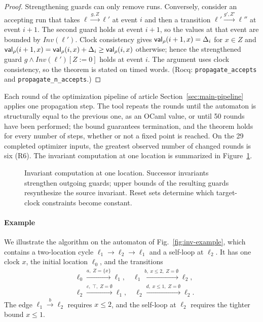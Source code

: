 \begin{proof}
Strengthening guards can only remove runs.  Conversely, consider an accepting
run that takes $\ell\xrightarrow{g,Z}\ell'$ at event $i$ and then a transition
$\ell'\xrightarrow{g',Z'}\ell''$ at event $i+1$.  The second guard holds at event
$i+1$, so the values at that event are bounded by $\mathit{Inv}(\ell')$.  Clock
consistency gives $\mathsf{val}_\rho(i+1,x)=\Delta_i$ for $x\in Z$ and
$\mathsf{val}_\rho(i+1,x)=\mathsf{val}_\rho(i,x)+\Delta_i\ge\mathsf{val}_\rho(i,x)$ otherwise; hence
the strengthened guard $g\wedge\mathit{Inv}(\ell')[Z:=0]$ holds at event $i$.
The argument uses clock consistency, so the theorem is stated on timed words.
(Rocq: \texttt{propagate\_\allowbreak{}accepts} and
\texttt{propagate\_\allowbreak{}n\_\allowbreak{}accepts}.)
\end{proof}

Each round of the optimization pipeline of article Section~\ref{sec:main-pipeline}
applies one propagation step.  The tool repeats the rounds until the
automaton is structurally equal to the previous one, as an OCaml value, or
until 50 rounds have been performed; the bound guarantees termination, and the
theorem holds for every number of steps, whether or not a fixed point is
reached. On the 29 completed optimizer inputs, the greatest observed number
of changed rounds is six (R6).
The invariant computation at one location is summarized in Figure~\ref{fig:main-inv-unified}.

\begin{figure}[t]
\centering

\caption{Invariant computation at one location. Successor invariants strengthen outgoing
guards; upper bounds of the resulting guards resynthesize the source
invariant. Reset sets determine which target-clock constraints become
constant.}
\label{fig:main-inv-unified}
\end{figure}

\paragraph{Example}
We illustrate the algorithm on the automaton of Fig.~\ref{fig:inv-example},
which contains a two-location cycle $\ell_1\to\ell_2\to\ell_1$ and a self-loop
at $\ell_2$.  It has one clock $x$, the initial location $\ell_0$, and the
transitions
\[
\begin{aligned}
&\ell_0 \xrightarrow{a,\;Z=\{x\}} \ell_1,\quad
 \ell_1 \xrightarrow{b,\;x\le 2,\;Z=\emptyset} \ell_2,\\
&\ell_2 \xrightarrow{c,\;\top,\;Z=\emptyset} \ell_1,\quad
 \ell_2 \xrightarrow{d,\;x\le 1,\;Z=\emptyset} \ell_2.
\end{aligned}
\]
The edge $\ell_1\xrightarrow{b}\ell_2$ requires $x\le2$, and the self-loop at
$\ell_2$ requires the tighter bound $x\le1$.

